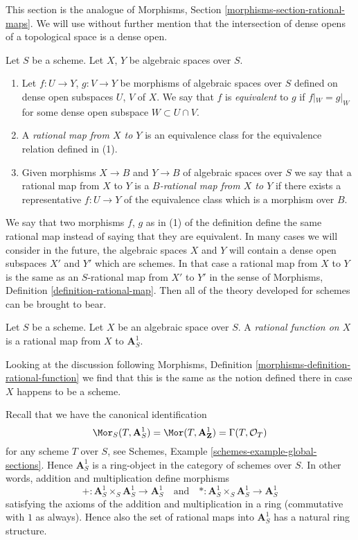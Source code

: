 \noindent
This section is the analogue of
Morphisms, Section \ref{morphisms-section-rational-maps}.
We will use without further mention that the intersection of dense opens
of a topological space is a dense open.

\begin{definition}
\label{definition-rational-map}
Let $S$ be a scheme. Let $X$, $Y$ be algebraic spaces over $S$.
\begin{enumerate}
\item Let $f : U \to Y$, $g : V \to Y$ be morphisms of algebraic spaces
over $S$ defined on dense open subspaces $U$, $V$ of $X$. We say that $f$ is
{\it equivalent} to $g$ if $f|_W = g|_W$ for some dense open
subspace $W \subset U \cap V$.
\item A {\it rational map from $X$ to $Y$}
is an equivalence class for the equivalence relation defined in (1).
\item Given morphisms $X \to B$ and $Y \to B$ of algebraic spaces over $S$
we say that a rational map from $X$ to $Y$ is a
{\it $B$-rational map from $X$ to $Y$}
if there exists a representative $f : U \to Y$ of the equivalence
class which is a morphism over $B$.
\end{enumerate}
\end{definition}

\noindent
We say that two morphisms $f$, $g$ as in (1) of the definition
define the same rational map instead of saying that they are equivalent.
In many cases we will consider in the future, the algebraic spaces
$X$ and $Y$ will contain a dense open subspaces $X'$ and $Y'$ which
are schemes. In that case a rational map from $X$ to $Y$ is the same
as an $S$-rational map from $X'$ to $Y'$ in the sense of
Morphisms, Definition \ref{definition-rational-map}.
Then all of the theory developed for schemes can be brought to bear.

\begin{definition}
\label{definition-rational-function}
Let $S$ be a scheme. Let $X$ be an algebraic space over $S$. A
{\it rational function on $X$} is a rational map from $X$ to $\mathbf{A}^1_S$.
\end{definition}

\noindent
Looking at the discussion following
Morphisms, Definition \ref{morphisms-definition-rational-function}
we find that this is the same as the notion defined there in case
$X$ happens to be a scheme.

\medskip\noindent
Recall that we have the canonical identification
$$
\Mor_S(T, \mathbf{A}^1_S) = \Mor(T, \mathbf{A}^1_\mathbf{Z}) =
\Gamma(T, \mathcal{O}_T)
$$
for any scheme $T$ over $S$, see
Schemes, Example \ref{schemes-example-global-sections}.
Hence $\mathbf{A}^1_S$ is a ring-object in the
category of schemes over $S$. In other words, addition
and multiplication define morphisms
$$
+ : \mathbf{A}^1_S \times_S \mathbf{A}^1_S \to \mathbf{A}^1_S
\quad\text{and}\quad
* : \mathbf{A}^1_S \times_S \mathbf{A}^1_S \to \mathbf{A}^1_S
$$
satisfying the axioms of the addition and multiplication in a ring
(commutative with $1$ as always). Hence also the set of rational
maps into $\mathbf{A}^1_S$ has a natural ring structure.

